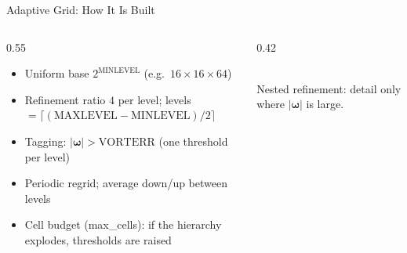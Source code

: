 \documentclass[10pt,aspectratio=43]{beamer}
\begin{document}
\begin{frame}{Adaptive Grid: How It Is Built}
  \begin{columns}[T]
    \begin{column}{0.55\textwidth}
      \begin{itemize}
        \item Uniform base $2^{\mathrm{MINLEVEL}}$ (e.g.\ $16\times16\times64$)
        \item Refinement ratio $4$ per level; levels $=\lceil(\mathrm{MAXLEVEL}-\mathrm{MINLEVEL})/2\rceil$
        \item Tagging: $|\boldsymbol{\omega}|>\mathrm{VORTERR}$ (one threshold per level)
        \item Periodic regrid; average down/up between levels
        \item Cell budget (max\_cells): if the hierarchy explodes, thresholds are raised
      \end{itemize}
    \end{column}
    \begin{column}{0.42\textwidth}
      \centering
      \\[0.15cm]
      {\scriptsize Nested refinement: detail only where $|\boldsymbol{\omega}|$ is large.}
    \end{column}
  \end{columns}
\end{frame}
\end{document}
